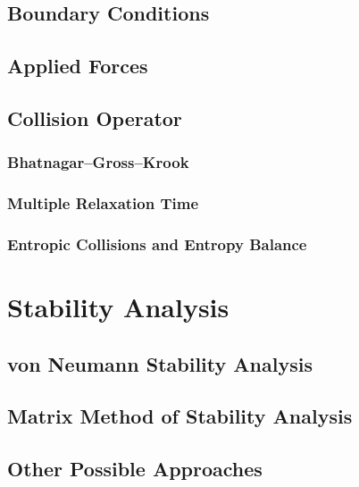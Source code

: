 \documentclass{article}
\begin{document}
\subsection{Boundary Conditions}

\subsection{Applied Forces}

\subsection{Collision Operator} %

\subsubsection{Bhatnagar--Gross--Krook}

\subsubsection{Multiple Relaxation Time}

\subsubsection{Entropic Collisions and Entropy Balance}

\section{Stability Analysis}

\subsection{von Neumann Stability Analysis}

\subsection{Matrix Method of Stability Analysis}

\subsection{Other Possible Approaches}
\end{document}

